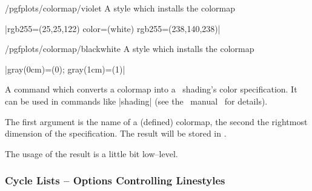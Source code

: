 \begin{stylekey}{/pgfplots/colormap/violet}
	A style which installs the colormap

	|{rgb255=(25,25,122) color=(white) rgb255=(238,140,238)}|

\end{stylekey}

\begin{stylekey}{/pgfplots/colormap/blackwhite}
	A style which installs the colormap

	|{gray(0cm)=(0); gray(1cm)=(1)}|

\end{stylekey}

\begin{command}{\pgfplotscolormaptoshadingspec{}}
	A command which converts a colormap into a \PGF\ shading's color specification. It can be used in commands like |\pgfdeclare*shading| (see the \PGF\ manual~\cite{tikz} for details).

	The first argument is the name of a (defined) colormap, the second the rightmost dimension of the specification. The result will be stored in .
\begin{codeexample}[]
	\result
	\def\tempb{\pgfdeclarehorizontalshading{tempshading}{1cm}}%
	\expandafter\tempb\expandafter{\result}%
\end{codeexample}
The usage of the result  is a little bit low--level.
\end{command}

\subsubsection{Cycle Lists -- Options Controlling Linestyles}

